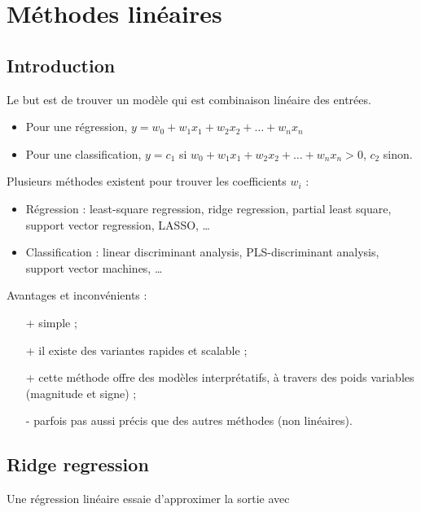 \chapter{Méthodes linéaires}

	\section{Introduction}
	Le but est de trouver un modèle qui est combinaison linéaire des entrées.

	\begin{itemize}
		\item Pour une régression, $y = w_0 + w_1 x_1 + w_2 x_2 + \dots + w_n x_n$
		\item Pour une classification, $y = c_1$ si $w_0 + w_1 x_1 + w_2 x_2 + \dots + w_n x_n > 0$, $c_2$ sinon.
	\end{itemize}


	Plusieurs méthodes existent pour trouver les coefficients $w_i$ : 

	\begin{itemize}
		\item Régression : least-square regression, ridge regression, partial least square, support vector regression, LASSO, \dots
		\item Classification : linear discriminant analysis, PLS-discriminant analysis, support vector machines, \dots \\
	\end{itemize} 

	Avantages et inconvénients :
	
	\begin{itemize}
		\item[+] simple ;
		\item[+] il existe des variantes rapides et scalable ;
		\item[+] cette méthode offre des modèles interprétatifs, à travers des poids variables (magnitude et signe) ;
		\item[-] parfois pas aussi précis que des autres méthodes (non linéaires).
	\end{itemize}

	\section{Ridge regression}
	
	Une régression linéaire essaie d'approximer la sortie avec
	
